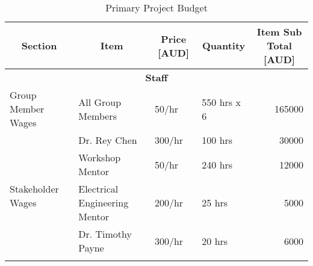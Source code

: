 \begin{table}[h]
\caption{Primary Project Budget}
\label{tab:Budget}
\centering
\resizebox{1\textwidth}{!}
{
\begin{tabular}{|l|l|l|l|r|}
\hline
\multicolumn{1}{|c|}{Section}                      & \multicolumn{1}{c|}{Item}          & \multicolumn{1}{c|}{Price {[}AUD{]}} & \multicolumn{1}{c|}{Quantity} & \multicolumn{1}{c|}{Item Sub Total {[}AUD{]}} \\ \hline
\multicolumn{5}{|c|}{\textbf{Staff}}                                                                                                                                                                           \\ \hline
\multirow{5}{*}{Group Member Wages}                & \multirow{5}{*}{All Group Members} & \multirow{5}{*}{50/hr}               & \multirow{5}{*}{550 hrs x 6}  & \multirow{5}{*}{165000}               \\
                                                   &                                    &                                      &                               &                                               \\
                                                   &                                    &                                      &                               &                                               \\
                                                   &                                    &                                      &                               &                                               \\
                                                   &                                    &                                      &                               &                                               \\ \hline
\multirow{5}{*}{Stakeholder Wages}                  & Dr. Rey Chen                           & 300/hr                                  & 100 hrs                       & 30000                                             \\ \cline{2-5} 
                                                   & Workshop Mentor                    & 50/hr                                & 240 hrs                       & 12000                                         \\ \cline{2-5} 
                                                   & Electrical Engineering Mentor       & 200/hr                                  & 25 hrs                        &  \multicolumn{1}{r|}{5000}                         \\ \cline{2-5} & Dr. Timothy Payne                      & 300/hr                               & 20 hrs                        & 6000                                             \\ \cline{2-5} 

\end{tabular}}
\end{table}
